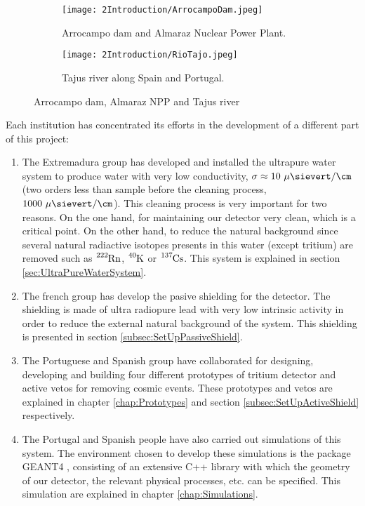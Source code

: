 \begin{figure}
\centering
    \begin{subfigure}[b]{0.45\textwidth}
    \centering
    \texttt{[image: 2Introduction/ArrocampoDam.jpeg]}  
    \caption{Arrocampo dam and Almaraz Nuclear Power Plant.\label{subfig:Arrocampo_Dam}}
    \end{subfigure}
    \hfill
    \begin{subfigure}[b]{0.45\textwidth}
    \centering
    \texttt{[image: 2Introduction/RioTajo.jpeg]}  
    \caption{Tajus river along Spain and Portugal.\label{subfig:TajusRiver}}
    \end{subfigure}
 \caption{Arrocampo dam, Almaraz NPP and Tajus river}
 \label{fig:Arrocampo}
\end{figure}

Each institution has concentrated its efforts in the development of a different part of this project:

\begin{enumerate}
\item{} The Extremadura group has developed and installed the ultrapure water system to produce water with very low conductivity, $\sigma \approx 10~\mu\sievert/\cm$ (two orders less than sample before the cleaning process, $1000~\mu\sievert/\cm$). This cleaning process is very important for two reasons. On the one hand, for maintaining our detector very clean, which is a critical point. On the other hand, to reduce the natural background since several natural radiactive isotopes presents in this water (except tritium) are removed such as $\ce{^{222}Rn}$, $\ce{^{40}K}$ or $\ce{^{137}Cs}$. This system is explained in section \ref{sec:UltraPureWaterSystem}.

\item{} The french group has develop the pasive shielding for the detector. The shielding is made of ultra radiopure lead with very low intrinsic activity in order to reduce the external natural background of the system. This shielding is presented in section \ref{subsec:SetUpPassiveShield}.

\item{} The Portuguese and Spanish group have collaborated for designing, developing and building four different prototypes of tritium detector and active vetos for removing cosmic events. These prototypes and vetos are explained in chapter \ref{chap:Prototypes} and section \ref{subsec:SetUpActiveShield} respectively.

\item{} The Portugal and Spanish people have also carried out simulations of this system. The environment chosen to develop these simulations is the package GEANT4 \cite{Geant4WebPage}, consisting of an extensive C++ library with which the geometry of our detector, the relevant physical processes, etc. can be specified. This simulation are explained in chapter \ref{chap:Simulations}.

\end{enumerate}

